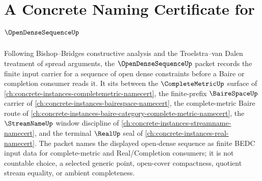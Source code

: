 \chapter{A Concrete Naming Certificate for $\OpenDenseSequenceUp$}
\label{ch:concrete-instances-open-dense-sequence-namecert}

Following Bishop--Bridges constructive analysis and the Troelstra--van Dalen treatment of spread arguments, the $\OpenDenseSequenceUp$ packet records the finite input carrier for a sequence of open dense constraints before a Baire or completion consumer reads it. It sits between the $\CompleteMetricUp$ surface of \autoref{ch:concrete-instances-completemetric-namecert}, the finite-prefix $\BaireSpaceUp$ carrier of \autoref{ch:concrete-instances-bairespace-namecert}, the complete-metric Baire route of \autoref{ch:concrete-instances-baire-category-complete-metric-namecert}, the $\StreamNameUp$ window discipline of \autoref{ch:concrete-instances-streamname-namecert}, and the terminal $\RealUp$ seal of \autoref{ch:concrete-instances-real-namecert}. The packet names the displayed open-dense sequence as finite BEDC input data for complete-metric and Real/Completion consumers; it is not countable choice, a selected generic point, open-cover compactness, quotient stream equality, or ambient completeness.

